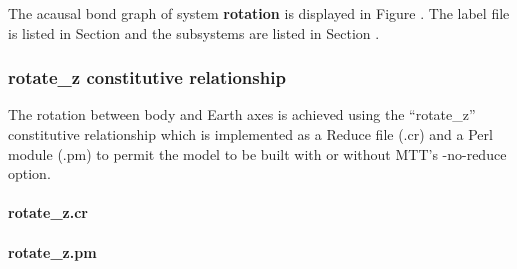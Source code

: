 
The acausal bond graph of system \textbf{rotation} is
displayed in Figure   
.
The label file is listed in Section  and the
subsystems are listed in Section .

\subsubsection{rotate\_z constitutive relationship}
The rotation between body and Earth axes is achieved using the ``rotate\_z'' constitutive relationship which is implemented as a Reduce file (.cr) and a Perl module (.pm) to permit the model to be built with or without MTT's -no-reduce option.

\paragraph{rotate\_z.cr}
\footnotesize

\normalsize

\paragraph{rotate\_z.pm}
\footnotesize

\normalsize
